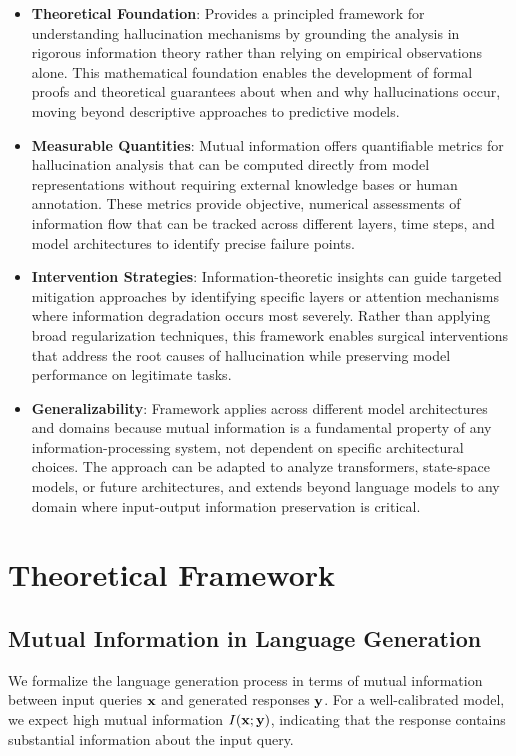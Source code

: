 \begin{itemize}
    \item \textbf{Theoretical Foundation}: Provides a principled framework for understanding hallucination mechanisms by grounding the analysis in rigorous information theory rather than relying on empirical observations alone. This mathematical foundation enables the development of formal proofs and theoretical guarantees about when and why hallucinations occur, moving beyond descriptive approaches to predictive models.
    \item \textbf{Measurable Quantities}: Mutual information offers quantifiable metrics for hallucination analysis that can be computed directly from model representations without requiring external knowledge bases or human annotation. These metrics provide objective, numerical assessments of information flow that can be tracked across different layers, time steps, and model architectures to identify precise failure points.
    \item \textbf{Intervention Strategies}: Information-theoretic insights can guide targeted mitigation approaches by identifying specific layers or attention mechanisms where information degradation occurs most severely. Rather than applying broad regularization techniques, this framework enables surgical interventions that address the root causes of hallucination while preserving model performance on legitimate tasks.
    \item \textbf{Generalizability}: Framework applies across different model architectures and domains because mutual information is a fundamental property of any information-processing system, not dependent on specific architectural choices. The approach can be adapted to analyze transformers, state-space models, or future architectures, and extends beyond language models to any domain where input-output information preservation is critical.
\end{itemize}

\section{Theoretical Framework}
\label{sec:hall_theory}

\subsection{Mutual Information in Language Generation}
\label{subsec:mi_generation}

We formalize the language generation process in terms of mutual information between input queries ${\mathbf{x}}$ and generated responses ${\mathbf{y}}$. For a well-calibrated model, we expect high mutual information $I({\mathbf{x}}; {\mathbf{y}})$, indicating that the response contains substantial information about the input query.

